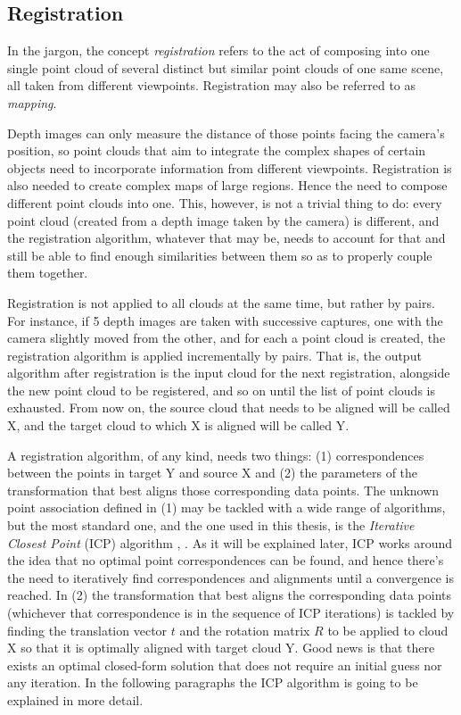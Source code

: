 \documentclass[../main.tex]{subfiles}
\begin{document}
\subsection{Registration}
In the jargon, the concept \emph{registration} refers to the act of composing into one single point cloud of several distinct but similar point clouds of one same scene, all taken from different viewpoints. Registration may also be referred to as \emph{mapping}.

Depth images can only measure the distance of those points facing the camera's position, so point clouds that aim to integrate the complex shapes of certain objects need to incorporate information from different viewpoints. Registration is also needed to create complex maps of large regions. Hence the need to compose different point clouds into one. This, however, is not a trivial thing to do: every point cloud (created from a depth image taken by the camera) is different, and the registration algorithm, whatever that may be, needs to account for that and still be able to find enough similarities between them so as to properly couple them together.

Registration is not applied to all clouds at the same time, but rather by pairs. For instance, if 5 depth images are taken with successive captures, one with the camera slightly moved from the other, and for each a point cloud is created, the registration algorithm is applied incrementally by pairs. That is, the output algorithm after registration is the input cloud for the next registration, alongside the new point cloud to be registered, and so on until the list of point clouds is exhausted. From now on, the source cloud that needs to be aligned will be called X, and the target cloud to which X is aligned will be called Y.

A registration algorithm, of any kind, needs two things: (1) correspondences between the points in target Y and source X and (2) the parameters of the transformation that best aligns those corresponding data points. The unknown point association defined in (1) may be tackled with a wide range of algorithms, but the most standard one, and the one used in this thesis, is the \emph{Iterative Closest Point} (ICP) algorithm \cite{icp_chen}, \cite{icp_besl}. As it will be explained later, ICP works around the idea that no optimal point correspondences can be found, and hence there's the need to iteratively find correspondences and alignments until a convergence is reached. In (2) the transformation that best aligns the corresponding data points (whichever that correspondence is in the sequence of ICP iterations) is tackled by finding the translation vector $t$ and the rotation matrix $R$ to be applied to cloud X so that it is optimally aligned with target cloud Y. Good news is that there exists an optimal closed-form solution that does not require an initial guess nor any iteration. In the following paragraphs the ICP algorithm is going to be explained in more detail.
\end{document}
